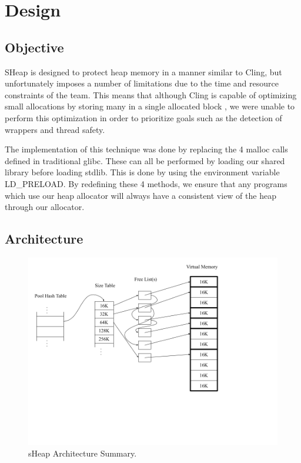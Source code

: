 \documentclass[conference]{IEEEtran}
\begin{document}
\section{Design}

\subsection{Objective}
SHeap is designed to protect heap memory in a manner similar to Cling, but 
unfortunately imposes a number of limitations due to the time and resource 
constraints of the team. This means that although Cling is capable of 
optimizing small allocations by storing many in a single allocated block 
\cite{b1}, we were unable to perform this optimization in order to 
prioritize goals such as the detection of wrappers and thread safety.

The implementation of this technique was done by replacing the 4 malloc 
calls defined in traditional glibc. These can all be performed by loading 
our shared library before loading stdlib. This is done by using the 
environment variable LD\_PRELOAD. By redefining these 4 methods, we ensure 
that any programs which use our heap allocator will always have a 
consistent view of the heap through our allocator.

\subsection{Architecture}

\begin{figure}[htbp]
  \centering
  \includegraphics[width=\linewidth]{sheap_model.png}
  \caption{sHeap Architecture Summary.}
  \label{fig:sheap-model}
\end{figure}
\end{document}
